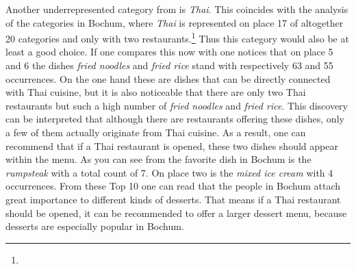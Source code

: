 Another underrepresented category from  is \textit{Thai}. This coincides with the analysis of the categories in Bochum, where \textit{Thai} is represented on place 17 of altogether 20 categories and only with two restaurants.\footnote{} Thus this category would also be at least a good choice. If one compares this now with  one notices that on place 5 and 6 the dishes \textit{fried noodles} and \textit{fried rice} stand with respectively 63 and 55 occurrences. On the one hand these are dishes that can be directly connected with Thai cuisine, but it is also noticeable that there are only two Thai restaurants but such a high number of \textit{fried noodles} and \textit{fried rice}.
This discovery can be interpreted that although there are restaurants offering these dishes, only a few of them actually originate from Thai cuisine. As a result, one can recommend that if a Thai restaurant is opened, these two dishes should appear within the menu.
As you can see from  the favorite dish in Bochum is the \textit{rumpsteak} with a total count of 7. On place two is the \textit{mixed ice cream} with 4 occurrences. From these Top 10 one can read that the people in Bochum attach great importance to different kinds of desserts. That means if a Thai restaurant should be opened, it can be recommended to offer a larger dessert menu, because desserts are especially popular in Bochum.